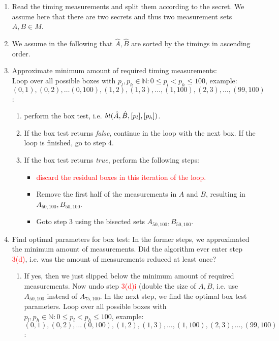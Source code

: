 \documentclass[12pt]{article}
\newcommand{\id}[1]{\mbox{\textit{#1}}}
\begin{document}
\begin{enumerate}
\item Read the timing measurements and split them according to the secret. We assume here that there are two secrets and thus two measurement sets $A,B\in M$.

\item We assume in the following that $\hat{A}, \hat{B}$ are sorted by the timings in ascending order.

\item Approximate minimum amount of required timing measurements:\\
  Loop over all possible boxes with $p_l,p_h\in \mathbb{N}: 0 \leq p_l < p_h \leq 100$,
  example:\\ $(0,1), (0,2), \ldots (0,100), (1,2), (1,3), \ldots, (1,100), (2,3), \ldots, (99,100)$:
  \begin{enumerate}
    \item perform the box test, i.e. $\id{bt}(\hat{A}, \hat{B}, [p_l], [p_h])$.
    \item If the box test returns \id{false}, continue in the
      loop with the next box. If the loop is finished, go to step 4.
    \item If the box test returns \id{true}, perform the following steps:
      \begin{itemize}
        \item \textcolor{red}{discard the residual boxes in this iteration of the loop.}
        \item Remove the first half of the measurements in $A$ and $B$, resulting in $A_{50,100}, B_{50,100}$.
        \item Goto step 3 using the bisected sets $A_{50,100}, B_{50,100}$.
      \end{itemize}
   \end{enumerate}

\item Find optimal parameters for box test:
  In the former steps, we approximated the minimum amount of measurements.
  Did the algorithm ever enter step \textcolor{red}{3(d)}, i.e. was the amount of measurements
  reduced at least once?
  \begin{enumerate}
    \item If yes, then we just slipped below the minimum amount of required measurements.
    Now undo step \textcolor{red}{3(d)i} (double the size of $A,B$, i.e. use $A_{50,100}$ instead of
    $A_{75,100}$. In the next step, we find the optimal box test parameters. 
    Loop over all possible boxes with $p_l,p_h\in \mathbb{N}: 0 \leq p_l < p_h \leq 100$,
    example:\\ $(0,1), (0,2), \ldots (0,100), (1,2), (1,3), \ldots, (1,100), (2,3), \ldots, (99,100)$:


\end{enumerate}
\end{enumerate}
\end{document}
